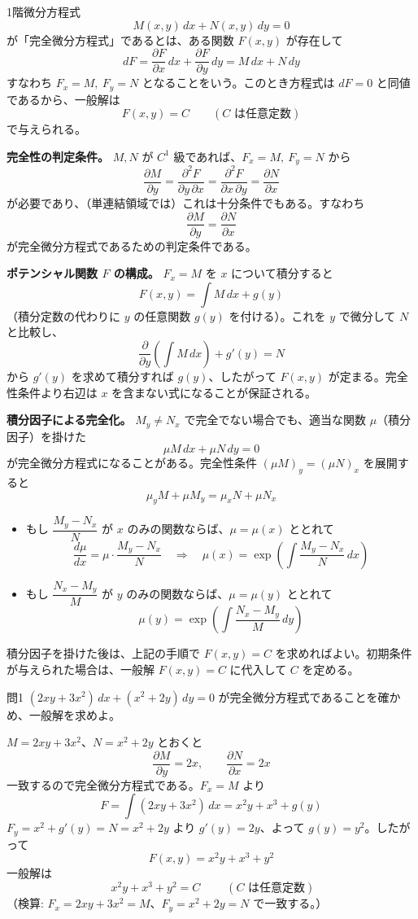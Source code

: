 \documentclass[a4paper,11pt]{article}
\begin{document}


\noindent
1階微分方程式
\[
M(x,y)\,dx + N(x,y)\,dy = 0
\]
が「完全微分方程式」であるとは、ある関数 $F(x,y)$ が存在して
\[
dF = \frac{\partial F}{\partial x}\,dx + \frac{\partial F}{\partial y}\,dy = M\,dx + N\,dy
\]
すなわち $F_x = M,\ F_y = N$ となることをいう。このとき方程式は $dF = 0$ と同値であるから、一般解は
\[
F(x,y) = C \qquad (C \text{ は任意定数})
\]
で与えられる。

\medskip
\noindent
\textbf{完全性の判定条件。}
$M, N$ が $C^1$ 級であれば、$F_x = M,\ F_y = N$ から
\[
\frac{\partial M}{\partial y} = \frac{\partial^2 F}{\partial y\,\partial x} = \frac{\partial^2 F}{\partial x\,\partial y} = \frac{\partial N}{\partial x}
\]
が必要であり、（単連結領域では）これは十分条件でもある。すなわち
\[
\frac{\partial M}{\partial y} = \frac{\partial N}{\partial x}
\]
が完全微分方程式であるための判定条件である。

\medskip
\noindent
\textbf{ポテンシャル関数 $F$ の構成。}
$F_x = M$ を $x$ について積分すると
\[
F(x,y) = \int M\,dx + g(y)
\]
（積分定数の代わりに $y$ の任意関数 $g(y)$ を付ける）。これを $y$ で微分して $N$ と比較し、
\[
\frac{\partial}{\partial y}\left(\int M\,dx\right) + g'(y) = N
\]
から $g'(y)$ を求めて積分すれば $g(y)$、したがって $F(x,y)$ が定まる。完全性条件より右辺は $x$ を含まない式になることが保証される。

\medskip
\noindent
\textbf{積分因子による完全化。}
$M_y \neq N_x$ で完全でない場合でも、適当な関数 $\mu$（積分因子）を掛けた
\[
\mu M\,dx + \mu N\,dy = 0
\]
が完全微分方程式になることがある。完全性条件 $(\mu M)_y = (\mu N)_x$ を展開すると
\[
\mu_y M + \mu M_y = \mu_x N + \mu N_x
\]
\begin{itemize}
\item もし $\dfrac{M_y - N_x}{N}$ が $x$ のみの関数ならば、$\mu = \mu(x)$ ととれて
\[
\frac{d\mu}{dx} = \mu \cdot \frac{M_y - N_x}{N}
\quad\Longrightarrow\quad
\mu(x) = \exp\left(\int \frac{M_y - N_x}{N}\,dx\right)
\]
\item もし $\dfrac{N_x - M_y}{M}$ が $y$ のみの関数ならば、$\mu = \mu(y)$ ととれて
\[
\mu(y) = \exp\left(\int \frac{N_x - M_y}{M}\,dy\right)
\]
\end{itemize}
積分因子を掛けた後は、上記の手順で $F(x,y) = C$ を求めればよい。初期条件が与えられた場合は、一般解 $F(x,y) = C$ に代入して $C$ を定める。

\clearpage
\begin{mondaiboxS}{問1}
$(2xy + 3x^{2})\,dx + (x^{2} + 2y)\,dy = 0$ が完全微分方程式であることを確かめ、一般解を求めよ。
\end{mondaiboxS}
\kaitou
$M = 2xy + 3x^{2}$、$N = x^{2} + 2y$ とおくと
\[
\frac{\partial M}{\partial y} = 2x, \qquad \frac{\partial N}{\partial x} = 2x
\]
一致するので完全微分方程式である。$F_x = M$ より
\[
F = \int (2xy + 3x^{2})\,dx = x^{2}y + x^{3} + g(y)
\]
$F_y = x^{2} + g'(y) = N = x^{2} + 2y$ より $g'(y) = 2y$、よって $g(y) = y^{2}$。したがって
\[
F(x,y) = x^{2}y + x^{3} + y^{2}
\]
一般解は
\[
\boxed{\; x^{2}y + x^{3} + y^{2} = C \;}
\qquad (C \text{ は任意定数})
\]
（検算: $F_x = 2xy + 3x^{2} = M$、$F_y = x^{2} + 2y = N$ で一致する。）
\end{document}
